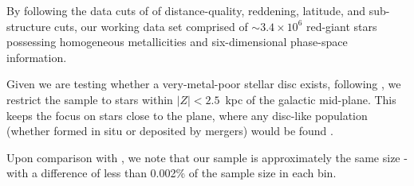 \documentclass[a4paper,12pt]{article}
\begin{document}
By following the data cuts of \citet{zhang2024existencemetalpoordiscmilky} of
distance-quality, reddening, latitude, and 
sub-structure cuts, our working data set comprised of $\sim3.4\times10^{6}$ 
red-giant stars possessing homogeneous metallicities and six-dimensional 
phase-space information.  

Given we are testing whether a very-metal-poor stellar disc exists, following \citet{zhang2024existencemetalpoordiscmilky}, 
we restrict the sample to stars within \mbox{$|Z|<2.5$ kpc} of the galactic mid-plane. 
This keeps the focus on stars close to the plane, where any disc-like population 
(whether formed in situ or deposited by mergers) would be found \citep{Tkachenko_2025}.

Upon comparison with \citet{zhang2024existencemetalpoordiscmilky}, we note that our 
sample is approximately the same size - with a difference of less than 0.002\% of the 
sample size in each bin.
\end{document}
